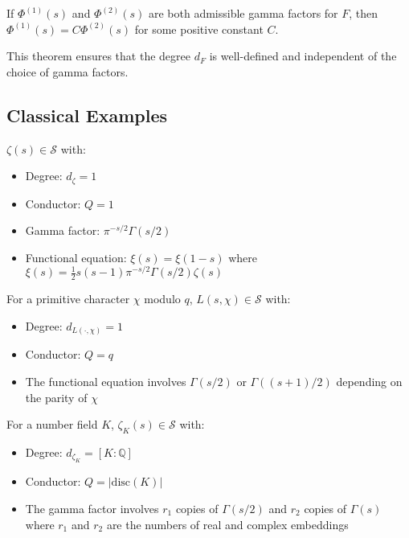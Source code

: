 \begin{theorem}
If $\Phi^{(1)}(s)$ and $\Phi^{(2)}(s)$ are both admissible gamma factors for $F$, then $\Phi^{(1)}(s) = C\Phi^{(2)}(s)$ for some positive constant $C$.
\end{theorem}

This theorem ensures that the degree $d_F$ is well-defined and independent of the choice of gamma factors.

\subsection{Classical Examples}

\begin{example}
$\zeta(s) \in \mathcal{S}$ with:
\begin{itemize}
\item Degree: $d_\zeta = 1$
\item Conductor: $Q = 1$
\item Gamma factor: $\pi^{-s/2}\Gamma(s/2)$
\item Functional equation: $\xi(s) = \xi(1-s)$ where $\xi(s) = \frac{1}{2}s(s-1)\pi^{-s/2}\Gamma(s/2)\zeta(s)$
\end{itemize}
\end{example}

\begin{example}
For a primitive character $\chi$ modulo $q$, $L(s,\chi) \in \mathcal{S}$ with:
\begin{itemize}
\item Degree: $d_{L(\cdot,\chi)} = 1$
\item Conductor: $Q = q$
\item The functional equation involves $\Gamma(s/2)$ or $\Gamma((s+1)/2)$ depending on the parity of $\chi$
\end{itemize}
\end{example}

\begin{example}
For a number field $K$, $\zeta_K(s) \in \mathcal{S}$ with:
\begin{itemize}
\item Degree: $d_{\zeta_K} = [K:\mathbb{Q}]$
\item Conductor: $Q = |\text{disc}(K)|$
\item The gamma factor involves $r_1$ copies of $\Gamma(s/2)$ and $r_2$ copies of $\Gamma(s)$ where $r_1$ and $r_2$ are the numbers of real and complex embeddings
\end{itemize}
\end{example}

